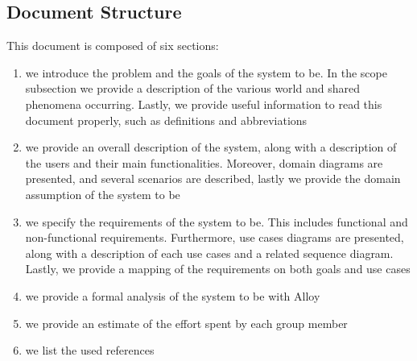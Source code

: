\subsection{Document Structure}
This document is composed of six sections:
\begin{enumerate}
    \item  we introduce the problem and the goals of the system to be. In the scope subsection
          we provide a description of the various world and shared phenomena occurring. Lastly, we provide useful information to read this document properly, such as definitions and abbreviations
    \item  we provide an overall description of the system, along with a description of the users and their main functionalities. Moreover, domain diagrams are presented, and several scenarios are described, lastly we provide the domain assumption of the system to be
    \item  we specify the requirements of the system to be. This includes functional and non-functional requirements. Furthermore, use cases diagrams are presented, along with a description of each use cases and a related sequence diagram. Lastly, we provide a mapping of the requirements on both goals and use cases
    \item  we provide a formal analysis of the system to be with Alloy
    \item  we provide an estimate of the effort spent by each group member
    \item  we list the used references
\end{enumerate}